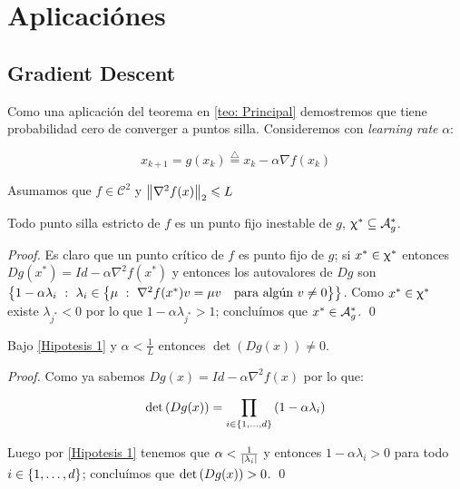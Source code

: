 \chapter{Aplicaci\'ones}\label{ch: aplicaciones}
\section{Gradient Descent}

Como una aplicaci\'on del teorema en \ref{teo: Principal} demostremos que \dg tiene probabilidad cero de converger a puntos silla. Consideremos \dg con \textit{learning rate} $\alpha$:

\begin{equation}
	\label{eq: GD}
	x_{k+1} = g(x_k) \stackrel{\triangle}{=} x_k - \alpha \nabla f(x_k)
\end{equation}

\begin{remark}
	\label{Hipotesis 1}
	Asumamos que $f \in \mathcal{C}^2$ y $\left\lVert\nabla^2 f(x)\right\rVert_2 \leqslant L$
\end{remark}

\begin{proposition}
	\label{prop: GD los puntos silla estrictos son fijos inestables}
	Todo punto silla estricto de $f$ es un punto fijo inestable de $g$, \ie $\upchi^* \subseteq \mathcal{A}_{g}^{*}$.
\end{proposition}

\begin{proof}
	Es claro que un punto cr\'itico de $f$ es punto fijo de $g$; si $x^* \in \upchi^*$ entonces $Dg(x^*) = Id - \alpha \nabla^2 f(x^*)$ y entonces los autovalores de $Dg$ son $\left\lbrace1 - \alpha \lambda_i ~:~ \lambda_i \in \left\lbrace\mu ~:~ \nabla^2 f(x^*)v = \mu v \quad \text{para alg\'un } v \neq 0\right\rbrace\right\rbrace$. Como $x^* \in \upchi^*$ existe $\lambda_{j^*} < 0$ por lo que $1 - \alpha\lambda_{j^*} >1$; conclu\'imos que $x^{*} \in \mathcal{A}_{g}^{*}$. \qed
	
	
\end{proof}

\begin{proposition}
	\label{prop: GD g es difeo local}
	Bajo \ref{Hipotesis 1} y $\alpha < \frac{1}{L}$ entonces $\det \left(Dg (x)\right) \neq 0$.
\end{proposition}

\begin{proof}
	Como ya sabemos $Dg(x) = Id - \alpha \nabla^2 f (x)$ por lo que:
	
	\begin{equation*}
		\det \left(Dg(x)\right) = \prod\limits_{i \in \left\lbrace1, \dots, d\right\rbrace}{\left(1 - \alpha \lambda_i\right)}
	\end{equation*}
	
	Luego por \ref{Hipotesis 1} tenemos que $\alpha < \frac{1}{\left\lvert\lambda_i\right\rvert}$ y entonces $1 - \alpha \lambda_i > 0$ para todo $i \in \left\lbrace1, \dots, d\right\rbrace$; conclu\'imos que $\det \left(Dg(x)\right) > 0$. \qed
	
\end{proof}

